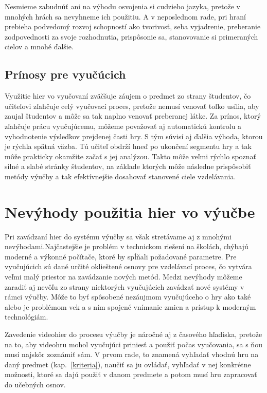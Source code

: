 \documentclass[10pt,twoside,slovak,a4paper]{article}
\begin{document}
Nesmieme zabudnúť ani na výhodu osvojenia si cudzieho jazyka, pretože v mnohých hrách sa nevyhneme ich použitiu. A v neposlednom rade, pri hraní prebieha podvedomý rozvoj schopností ako tvorivosť, seba vyjadrenie, preberanie zodpovednosti za svoje rozhodnutia\cite{6185607}, prispôsonie sa, stanovovanie si primeraných cielov a mnohé ďalšie.

\subsection{Prínosy pre vyučúcich} \label{vyhody:vyucujuci}

Využitie hier vo vyučovaní zväčšuje záujem o predmet zo strany študentov\cite{Ucenie}, čo učiteľovi zľahčuje celý vyučovací proces, pretože nemusí venovať toľko usília, aby zaujal študentov a môže sa tak naplno venovať preberanej látke. Za prínos, ktorý zľahčuje prácu vyučujúcemu, môžeme považovať aj automatickú kontrolu a vyhodnotenie výsledkov prejdenej časti hry. S tým súvisí aj ďalšia výhoda, ktorou je rýchla spätná väzba. Tú učiteľ obdrží hneď po ukončení segmentu hry a tak môže prakticky okamžite začať s jej analýzou. Takto môže veľmi rýchlo spoznať silné a slabé stránky študentov, na základe ktorých môže následne prispôsobiť metódy výučby a tak efektívnejšie dosahovať stanovené ciele vzdelávania.

\section{Nevýhody použitia hier vo výučbe} \label{nevyhody}

Pri zavádzaní hier do systému výučby sa však stretávame aj z mnohými nevýhodami.Najčastejšie je problém v technickom riešení na školách, chýbajú moderné a výkonné počítače, ktoré by spĺňali požadované parametre\cite{Videohry}. Pre vyučujúcich sú dané určité oklieštené osnovy pre vzdelávací proces, čo vytvára veľmi malý priestor na zavádzanie nových metód. Medzi nevýhody môžeme zaradiť aj nevôľu zo strany niektorých vyučujúcich zavádzať nové systémy v rámci výučby. Môže to byť spôsobené nezáujmom vyučujúceho o hry ako také alebo je problémom vek a s ním spojené vnímanie zmien a prístup k moderným technológiám. 

Zavedenie videohier do procesu výučby je náročné aj z časového hľadiska, pretože na to, aby videohru mohol vyučujúci priniesť a použiť počas vyučovania, sa s ňou musí najskôr zoznámiť sám. V prvom rade, to znamená vyhľadať vhodnú hru na daný predmet (kap.~\ref{kriteria}), naučiť sa ju ovládať, vyhľadať v nej konkrétne možnosti, ktoré sa dajú použiť v danom predmete a potom musí hru zapracovať do učebných osnov.
\end{document}
